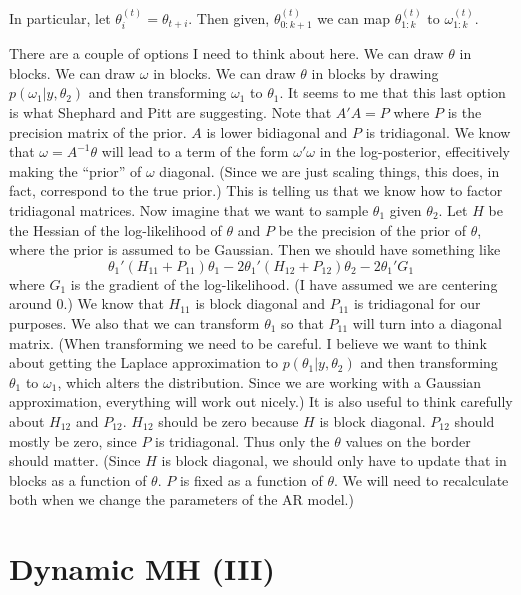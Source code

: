 \documentclass{article}
\begin{document}
In particular, let $\theta^{(t)}_{i} = \theta_{t+i}$.  Then given,
$\theta^{(t)}_{0:k+1}$ we can map $\theta^{(t)}_{1:k}$ to $\omega^{(t)}_{1:k}$.

There are a couple of options I need to think about here.  We can draw $\theta$
in blocks.  We can draw $\omega$ in blocks.  We can draw $\theta$ in blocks by
drawing $p(\omega_1 | y, \theta_2)$ and then transforming $\omega_1$ to
$\theta_1$.  It seems to me that this last option is what Shephard and Pitt are
suggesting.  Note that $A'A = P$ where $P$ is the precision matrix of the prior.
$A$ is lower bidiagonal and $P$ is tridiagonal.  We know that $\omega = A^{-1}
\theta$ will lead to a term of the form $\omega' \omega$ in the log-posterior,
effecitively making the ``prior'' of $\omega$ diagonal.  (Since we are just
scaling things, this does, in fact, correspond to the true prior.)  This is
telling us that we know how to factor tridiagonal matrices.  Now imagine that we
want to sample $\theta_1$ given $\theta_2$.  Let $H$ be the Hessian of the
log-likelihood of $\theta$ and $P$ be the precision of the prior of $\theta$, where
the prior is assumed to be Gaussian.  Then we should have something like
\[
\theta_1' (H_{11} + P_{11}) \theta_{1} - 2 \theta_1' (H_{12} + P_{12}) \theta_2
- 2 \theta_1' G_1
\]
where $G_1$ is the gradient of the log-likelihood.  (I have assumed we are
centering around 0.)  We know that $H_{11}$ is block diagonal and $P_{11}$ is
tridiagonal for our purposes.  We also that we can transform $\theta_1$ so that
$P_{11}$ will turn into a diagonal matrix.  (When transforming we need to be
careful.  I believe we want to think about getting the Laplace approximation to
$p(\theta_1 | y, \theta_2)$ and then transforming $\theta_1$ to $\omega_1$,
which alters the distribution.  Since we are working with a Gaussian
approximation, everything will work out nicely.)  It is also useful to think
carefully about $H_{12}$ and $P_{12}$.  $H_{12}$ should be zero because $H$ is
block diagonal.  $P_{12}$ should mostly be zero, since $P$ is tridiagonal.  Thus
only the $\theta$ values on the border should matter.  (Since $H$ is block
diagonal, we should only have to update that in blocks as a function of
$\theta$.  $P$ is fixed as a function of $\theta$.  We will need to recalculate
both when we change the parameters of the AR model.)

\section{Dynamic MH (III)}
\end{document}
